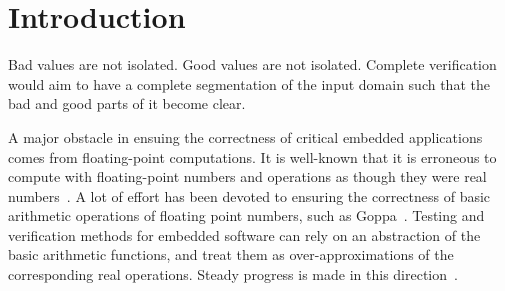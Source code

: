 \section{Introduction}

Bad values are not isolated. Good values are not isolated. Complete verification would aim to have a complete segmentation of the input domain such that the bad and good parts of it become clear. 



A major obstacle in ensuing the correctness of critical embedded applications comes from floating-point computations. It is well-known that it is erroneous to compute with floating-point numbers and operations as though they were real numbers~\cite{pitfalls}. A lot of effort has been devoted to ensuring the correctness of basic arithmetic operations of floating point numbers, such as Goppa~\cite{}. Testing and verification methods for embedded software can rely on an abstraction of the basic arithmetic functions, and treat them as over-approximations of the corresponding real operations. Steady progress is made in this direction~\cite{}. 

